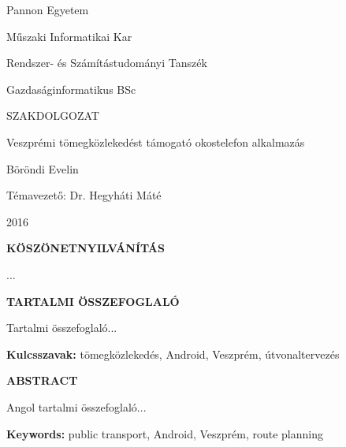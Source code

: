 \documentclass[a4paper,oneside,10pt]{report}
\begin{document}
\begin{titlepage}
\begin{center}
\Large
Pannon Egyetem

\vspace{10mm}
Műszaki Informatikai Kar

\vspace{10mm}
Rendszer- és Számítástudományi Tanszék

\vspace{10mm}
Gazdaságinformatikus BSc

\vspace{40mm}
\huge
SZAKDOLGOZAT

\vspace{10mm}
\LARGE
Veszprémi tömegközlekedést támogató okostelefon alkalmazás 

\vspace{10mm}
\Large
Böröndi Evelin

\vspace{40mm}
Témavezető: Dr. Hegyháti Máté

\vspace{10mm}
2016
\normalsize
\end{center}
\end{titlepage}



\pagestyle{empty} %



\newpage
\Large
\begin{center}
	\textbf{KÖSZÖNETNYILVÁNÍTÁS}
\end{center}
\normalsize
\noindent
...

\newpage
\Large
\begin{center}
	\textbf{TARTALMI ÖSSZEFOGLALÓ}
\end{center}
\normalsize
\noindent


Tartalmi összefoglaló...

\textbf{Kulcsszavak:} tömegközlekedés, Android, Veszprém, útvonaltervezés

\newpage

\Large
\begin{center}
	\textbf{ABSTRACT}
\end{center}
\normalsize
\noindent
Angol tartalmi összefoglaló...

\textbf{Keywords:} public transport, Android, Veszprém, route planning
\tableofcontents
\newpage
\listoffigures
\newpage

\end{document}
